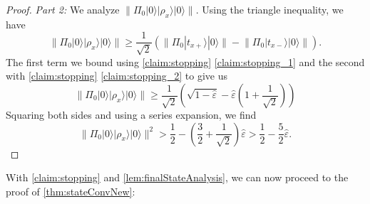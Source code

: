 \documentclass[cleveref, autoref, thm-restate,11pt]{article}
\theoremstyle{definition}
\newcommand{\ket}[1]{|#1\rangle}
\begin{document}
\begin{proof}
\vspace{.5cm}
\noindent\textit{Part 2:} We analyze $\|\Pi_0{\ket{0}\ket{\rho_x}}\ket{0}\|.$
Using the triangle inequality, we have
\begin{equation}\label{eq:linef}
\|\Pi_0{\ket{0}\ket{\rho_x}}\ket{0}\|\geq\frac{1}{\sqrt{2}}\left(
\|\Pi_0\ket{t_{x+}}\ket{0}\|-\left\|\Pi_0\ket{t_{x-}}\ket{0}\right\|\right).
\end{equation}
The first term we bound using \cref{claim:stopping} \cref{claim:stopping_1} and the second with \cref{claim:stopping} \cref{claim:stopping_2} to give us
\begin{equation}
\|\Pi_0{\ket{0}\ket{\rho_x}}\ket{0}\|\geq \frac{1}{\sqrt{2}}\left(\sqrt{1-\hat{\varepsilon}}-\hat{\varepsilon}\left(1+\frac{1}{\sqrt{2}}\right)\right)
\end{equation}
Squaring both sides and using a series expansion, we find
\begin{equation}
\|\Pi_0{\ket{0}\ket{\rho_x}}\ket{0}\|^2> \frac{1}{2}-\left(\frac{3}{2}+\frac{1}{\sqrt{2}}\right)\hat{\varepsilon}>\frac{1}{2}-\frac{5}{2}\hat{\varepsilon}.
\label{eq:breakout_cond}
\end{equation}
\end{proof}


With \cref{claim:stopping} and \cref{lem:finalStateAnalysis}, we can now proceed
to the proof of \cref{thm:stateConvNew}:
\end{document}

